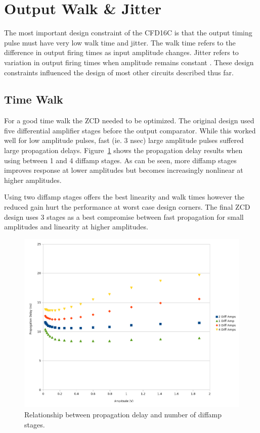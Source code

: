 \documentclass[12pt,oneside,final]{siuethesis}
\theoremstyle{definition}
\begin{document}
\section{Output Walk \& Jitter}
\par The most important design constraint of the CFD16C is that the output timing pulse must have very low walk time and jitter. The walk time refers to the difference in output firing times as input amplitude changes. Jitter refers to variation in output firing times when amplitude remains constant \cite{CFD}. These design constraints influenced the design of most other circuits described thus far.
\subsection{Time Walk}
\par For a good time walk the ZCD needed to be optimized. The original design used five differential amplifier stages before the output comparator. While this worked well for low amplitude pulses, fast (ie. 3 nsec) large amplitude pulses suffered large propagation delays. Figure~\ref{fig:diffampdelay} shows the propagation delay results when using between 1 and 4 diffamp stages. As can be seen, more diffamp stages improves response at lower amplitudes but becomes increasingly nonlinear at higher amplitudes. 
\par Using two diffamp stages offers the best linearity and walk times however the reduced gain hurt the performance at worst case design corners. The final ZCD design uses 3 stages as a best compromise between fast propagation for small amplitudes and linearity at higher amplitudes.
\begin{figure}[htbp!]
\centering
\includegraphics[scale=.55,keepaspectratio=true]{data/propogation.png}
\caption{Relationship between propagation delay and number of diffamp stages.}
\label{fig:diffampdelay}
\end{figure}
\end{document}
